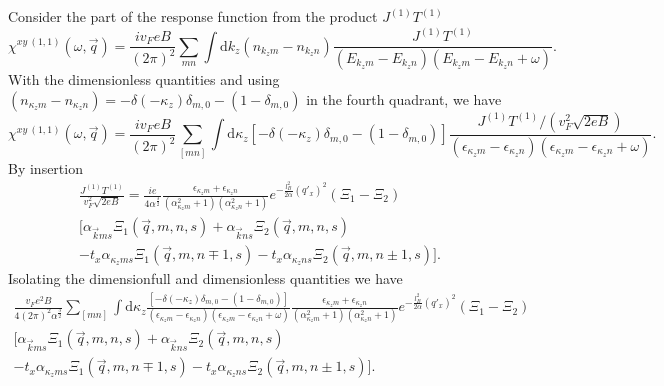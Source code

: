 Consider the part of the response function from the product \( J^{(1)} T^{(1)} \)
\begin{equation}
  \label{eq:64}
  \chi ^{xy~(1,1)} (\omega, \vec{q}) =
  \frac{iv_F eB}{(2\pi)^2}
  \sum\limits_{mn}^{} \int \mathrm{d} k_z
  (n_{k _z m} - n_{k _z n})
  \frac{J^{(1)} T^{(1)}}{(E_{k _{z} m} - E_{k _{z} n})(E_{k _{z} m} - E_{k _{z} n} + \omega)}.
\end{equation}
With the dimensionless quantities and using \( (n_{\kappa _z m} - n_{\kappa _z n}) = -\delta (-\kappa_z) \delta _{m,0} - (1-\delta_{m,0}) \) in the fourth quadrant, we have
\begin{equation}
  \chi ^{xy~(1,1)} (\omega, \vec{q}) =
  \frac{iv_F eB}{(2\pi)^2}
  \sum\limits_{[mn]}^{} \int \mathrm{d} \kappa_z
[-\delta (-\kappa_z) \delta _{m,0} - (1-\delta_{m,0})]
  \frac{J^{(1)} T^{(1)} / (v_F^2 \sqrt{2eB} )
  }{(\epsilon _{\kappa _{z} m} - \epsilon _{\kappa _{z} n})(\epsilon _{\kappa _{z} m} - \epsilon _{\kappa _{z} n} + \omega)}.
\end{equation}
By insertion
\begin{multline}
  \label{eq:66}
   \frac{J^{(1)} T^{(1)}}{v_{F}^2 \sqrt{2eB} } =
  \frac{i e}{4 \alpha^{\frac{3}{2}} }
  \frac{\epsilon_{\kappa _z m} + \epsilon_{\kappa _z n}}{
    (\alpha_{\kappa _{z} m}^2 + 1)(\alpha_{\kappa _{z} n}^2 + 1)
  }
  e^{-\frac{l_B^2}{2 \alpha } (q'_x)^2}
  (\Xi_1 - \Xi_2)\\
  \Big[
  \alpha _{\vec{k} m s} \Xi_{1} (\vec{q}, m, n, s)
  + \alpha _{\vec{k} n s} \Xi _{2} (\vec{q}, m, n, s)\\
  - t_x \alpha _{\kappa_z m s} \Xi _1(\vec{q}, m, n\mp 1, s)
  - t_x \alpha _{\kappa_z n s} \Xi _2(\vec{q}, m, n\pm 1, s)
  \Big].
\end{multline}
Isolating the dimensionfull and dimensionless quantities we have
\begin{multline}
  \label{eq:65}
  \frac{v_F e^2 B}{4 (2 \pi)^2 \alpha ^{\frac{3}{2}}}
  \sum\limits_{[mn]}^{} \int \mathrm{d} \kappa_z
  \frac{
  [-\delta (-\kappa_z) \delta _{m,0} - (1-\delta_{m,0})]
  }{(\epsilon _{\kappa _{z} m} - \epsilon _{\kappa _{z} n})(\epsilon _{\kappa _{z} m} - \epsilon _{\kappa _{z} n} + \omega)}
  \frac{\epsilon_{\kappa _z m} + \epsilon_{\kappa _z n}}{
    (\alpha_{\kappa _{z} m}^2 + 1)(\alpha_{\kappa _{z} n}^2 + 1)
  }
  e^{-\frac{l_B^2}{2 \alpha } (q'_x)^2}
  (\Xi_1 - \Xi_2)\\
  \Big[
  \alpha _{\vec{k} m s} \Xi_{1} (\vec{q}, m, n, s)
  + \alpha _{\vec{k} n s} \Xi _{2} (\vec{q}, m, n, s)\\
  - t_x \alpha _{\kappa_z m s} \Xi _1(\vec{q}, m, n\mp 1, s)
  - t_x \alpha _{\kappa_z n s} \Xi _2(\vec{q}, m, n\pm 1, s)
  \Big].
\end{multline}



